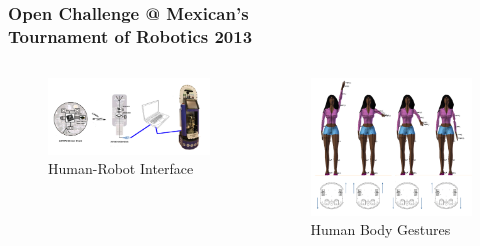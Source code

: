\documentclass[
first,
ETH1,
navigation
]{ETHbeamerclass}
\begin{document}
\begin{frame}
 \frametitle{Open Challenge @ Mexican's \\Tournament of Robotics 2013}

 \begin{columns}[onlytextwidth]
\begin{column}{0.5\textwidth}
 \begin{figure}
\includegraphics[scale=0.15]{hridd-blockdiagram}
\centering 
\caption{Human-Robot Interface}
\end{figure}
\end{column} 
\begin{column}{0.5\textwidth}
\begin{figure}
\includegraphics[scale=0.11]{tmr2013demodance}
\centering 
\caption{Human Body Gestures}
\end{figure}
    \end{column}
\end{columns}

\end{frame}
\end{document}
